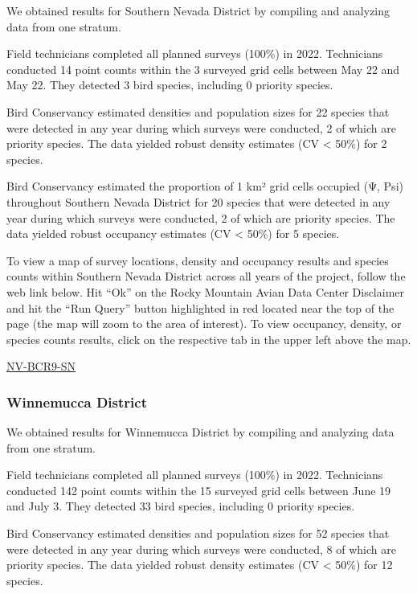 \documentclass[
  letterpaper,
  DIV=11,
  numbers=noendperiod,
  oneside]{scrreprt}
\begin{document}
We obtained results for Southern Nevada District by compiling and
analyzing data from one stratum.

Field technicians completed all planned surveys (100\%) in 2022.
Technicians conducted 14 point counts within the 3 surveyed grid cells
between May 22 and May 22. They detected 3 bird species, including 0
priority species.

Bird Conservancy estimated densities and population sizes for 22 species
that were detected in any year during which surveys were conducted, 2 of
which are priority species. The data yielded robust density estimates
(CV \textless{} 50\%) for 2 species.

Bird Conservancy estimated the proportion of 1 km² grid cells occupied
(Ψ, Psi) throughout Southern Nevada District for 20 species that were
detected in any year during which surveys were conducted, 2 of which are
priority species. The data yielded robust occupancy estimates (CV
\textless{} 50\%) for 5 species.

To view a map of survey locations, density and occupancy results and
species counts within Southern Nevada District across all years of the
project, follow the web link below. Hit ``Ok'' on the Rocky Mountain
Avian Data Center Disclaimer and hit the ``Run Query'' button
highlighted in red located near the top of the page (the map will zoom
to the area of interest). To view occupancy, density, or species counts
results, click on the respective tab in the upper left above the map.

\href{http://www.rmbo.org/new_site/adc/QueryWindow.aspx\#N4IgzgLgTghhCuBbEAuABCAcgNQLQCEBhAJQE5cBlTdfeKAUxnjQHsAzNAGRgDsATNAFleMAOb1E9HhDS40FFvAgALelB5pM9AG4w+MNABEAlpCjGAxhBABfIA==}{NV-BCR9-SN}

\hypertarget{winnemucca-district}{%
\subsubsection{Winnemucca District}\label{winnemucca-district}}

We obtained results for Winnemucca District by compiling and analyzing
data from one stratum.

Field technicians completed all planned surveys (100\%) in 2022.
Technicians conducted 142 point counts within the 15 surveyed grid cells
between June 19 and July 3. They detected 33 bird species, including 0
priority species.

Bird Conservancy estimated densities and population sizes for 52 species
that were detected in any year during which surveys were conducted, 8 of
which are priority species. The data yielded robust density estimates
(CV \textless{} 50\%) for 12 species.
\end{document}
